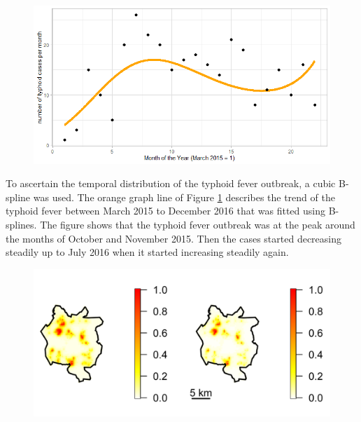 \begin{figure}[H]
    \begin{center}
        \includegraphics[scale=0.75]{Long term trend of temporal model - All Cases.png}
    \end{center}
     \label{fig:temporal-distribution-all-cases}
\end{figure}

To ascertain the temporal distribution of the typhoid fever outbreak, a cubic B-spline was used. The orange graph line of Figure \ref{fig:temporal-distribution-all-cases} describes the trend of the typhoid fever between March 2015 to December 2016 that was fitted using B-splines. The figure shows that the typhoid fever outbreak was at the peak around the months of October and November 2015. Then the cases started decreasing steadily up to July 2016 when it started increasing steadily again.

\begin{figure}[h]
    \begin{center}
        \includegraphics[scale=1.2]{Exceedance Probabilities - All Cases.png}
    \end{center}
     \label{fig:exceedance-plot-all-cases}
\end{figure}

